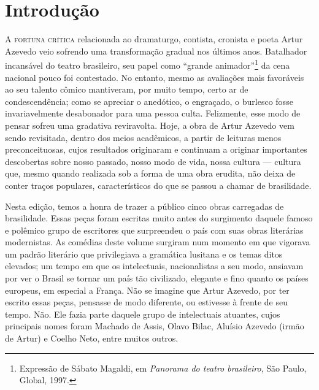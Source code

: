 \renewcommand{\fala}[1]{\noindent\quad\textsc{#1} ---}

\chapter[Introdução, \emph{por Larissa de Oliveira Neves}]{Introdução}

\textsc{A fortuna crítica} relacionada ao dramaturgo, contista, cronista e poeta
Artur Azevedo veio sofrendo uma transformação gradual nos últimos anos.
Batalhador incansável do teatro brasileiro, seu papel como “grande
animador”\footnote{ Expressão de Sábato Magaldi, em \textit{Panorama do teatro
brasileiro}, São Paulo, Global, 1997.} da cena nacional pouco foi contestado. No
entanto, mesmo as avaliações mais favoráveis ao seu talento cômico
mantiveram, por muito tempo, certo ar de condescendência; como se
apreciar o anedótico, o engraçado, o burlesco fosse invariavelmente
desabonador para uma pessoa culta. Felizmente, esse modo de pensar
sofreu uma gradativa reviravolta. Hoje, a obra de Artur Azevedo vem
sendo revisitada, dentro dos meios acadêmicos, a partir de leituras
menos preconceituosas, cujos resultados originaram e continuam a
originar importantes descobertas sobre nosso passado, nosso modo
de vida, nossa cultura --- cultura que, mesmo quando
realizada sob a forma de uma obra erudita, não deixa de conter traços
populares, característicos do que se passou a chamar de brasilidade.

Nesta edição, temos a honra de trazer a público cinco obras carregadas
de brasilidade. Essas peças foram escritas muito antes do surgimento
daquele famoso e polêmico grupo de escritores que surpreendeu o país
com suas obras literárias modernistas. As comédias deste volume
surgiram num momento em que vigorava um padrão literário que
privilegiava a gramática lusitana e os temas ditos elevados; um tempo em
que os intelectuais, nacionalistas a seu modo, ansiavam por ver o
Brasil se tornar um país tão civilizado, elegante e fino quanto os
países europeus, em especial a França. Não se imagine que Artur
Azevedo, por ter escrito essas peças, pensasse de modo diferente, ou
estivesse à frente de seu tempo. Não. Ele fazia parte daquele grupo de
intelectuais atuantes, cujos principais nomes foram Machado de Assis,
Olavo Bilac, Aluísio Azevedo (irmão de Artur) e Coelho Neto, entre
muitos outros. 

